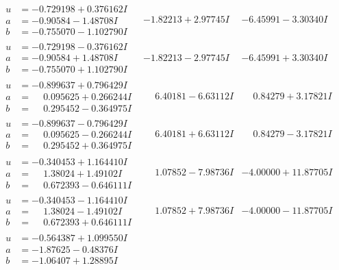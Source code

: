 \documentclass[1p]{elsarticle_modified}
\theoremstyle{definition}
\begin{document}
$$\begin{array}{c|c|c}
\begin{aligned}
u &= -0.729198 + 0.376162 I \\
a &= -0.90584 - 1.48708 I \\
b &= -0.755070 - 1.102790 I\end{aligned}
 & -1.82213 + 2.97745 I & -6.45991 - 3.30340 I \\ \hline\begin{aligned}
u &= -0.729198 - 0.376162 I \\
a &= -0.90584 + 1.48708 I \\
b &= -0.755070 + 1.102790 I\end{aligned}
 & -1.82213 - 2.97745 I & -6.45991 + 3.30340 I \\ \hline\begin{aligned}
u &= -0.899637 + 0.796429 I \\
a &= \phantom{-}0.095625 + 0.266244 I \\
b &= \phantom{-}0.295452 - 0.364975 I\end{aligned}
 & \phantom{-}6.40181 - 6.63112 I & \phantom{-}0.84279 + 3.17821 I \\ \hline\begin{aligned}
u &= -0.899637 - 0.796429 I \\
a &= \phantom{-}0.095625 - 0.266244 I \\
b &= \phantom{-}0.295452 + 0.364975 I\end{aligned}
 & \phantom{-}6.40181 + 6.63112 I & \phantom{-}0.84279 - 3.17821 I \\ \hline\begin{aligned}
u &= -0.340453 + 1.164410 I \\
a &= \phantom{-}1.38024 + 1.49102 I \\
b &= \phantom{-}0.672393 - 0.646111 I\end{aligned}
 & \phantom{-}1.07852 - 7.98736 I & -4.00000 + 11.87705 I \\ \hline\begin{aligned}
u &= -0.340453 - 1.164410 I \\
a &= \phantom{-}1.38024 - 1.49102 I \\
b &= \phantom{-}0.672393 + 0.646111 I\end{aligned}
 & \phantom{-}1.07852 + 7.98736 I & -4.00000 - 11.87705 I \\ \hline\begin{aligned}
u &= -0.564387 + 1.099550 I \\
a &= -1.87625 - 0.48376 I \\
b &= -1.06407 + 1.28895 I\end{aligned}

\end{array}$$
\end{document}

